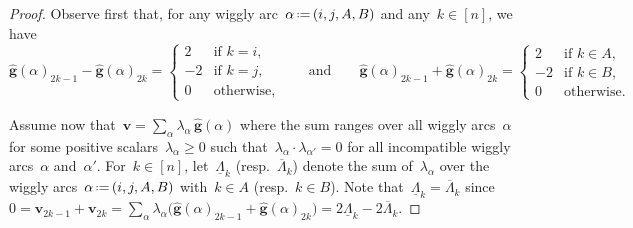 \documentclass{amsart}
\theoremstyle{definition}
\renewcommand{\b}[1]{{\boldsymbol{#1}}} %
\newcommand{\eqdef}{\mbox{\,\raisebox{0.2ex}{\scriptsize\ensuremath{\mathrm:}}\ensuremath{=}\,}} %
\begin{document}
\begin{proof}
Observe first that, for any wiggly arc~$\alpha \eqdef (i, j, A, B)$ and any~$k \in [n]$, we have
\[
\hat{\b{g}}(\alpha)_{2k-1} - \hat{\b{g}}(\alpha)_{2k} = \begin{cases} 2 & \text{if~$k = i$,} \\ -2 & \text{if~$k = j$,} \\ 0 & \text{otherwise}, \end{cases}
\qquad\text{and}\qquad
\hat{\b{g}}(\alpha)_{2k-1} + \hat{\b{g}}(\alpha)_{2k} = \begin{cases} 2 & \text{if~$k \in A$,} \\ -2 & \text{if~$k \in B$,} \\ 0 & \text{otherwise}. \end{cases}
\]

Assume now that~$\b{v} = \sum_\alpha \lambda_\alpha \, \hat{\b{g}}(\alpha)$ where the sum ranges over all wiggly arcs~$\alpha$ for some positive scalars~$\lambda_\alpha \ge 0$ such that~$\lambda_\alpha \cdot \lambda_{\alpha'} = 0$ for all incompatible wiggly arcs~$\alpha$ and~$\alpha'$.
For~$k \in [n]$, let~$\underline{\Lambda}_k$ (resp.~$\overline{\Lambda}_k$) denote the sum of~$\lambda_\alpha$ over the wiggly arcs~$\alpha \eqdef (i, j, A, B)$ with~$k \in A$ (resp.~$k \in B$).
Note that~$\underline{\Lambda}_k = \overline{\Lambda}_k$ since~$0 = \b{v}_{2k-1} + \b{v}_{2k} = \sum_\alpha \lambda_\alpha \big( \hat{\b{g}}(\alpha)_{2k-1} + \hat{\b{g}}(\alpha)_{2k} \big) = 2\underline{\Lambda}_k - 2\overline{\Lambda}_k$.


\end{proof}
\end{document}
